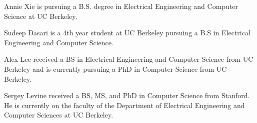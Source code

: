 \documentclass[10pt,journal,compsoc]{IEEEtran}
\begin{document}

\begin{IEEEbiographynophoto}{Annie Xie}
is pursuing a B.S. degree in Electrical Engineering and Computer Science at UC Berkeley. %
\end{IEEEbiographynophoto}
\vskip -13mm

\begin{IEEEbiographynophoto}{Sudeep Dasari} is a 4th year student at UC Berkeley pursuing a B.S in Electrical Engineering and Computer Science. %
\end{IEEEbiographynophoto}
\vskip -13mm

\begin{IEEEbiographynophoto}{Alex Lee} received a BS in Electrical Engineering and Computer Science from UC Berkeley and is currently pursuing a PhD in Computer Science from UC Berkeley. %
\end{IEEEbiographynophoto}
\vskip -13mm

\begin{IEEEbiographynophoto}{Sergey Levine} received a BS, MS, and PhD in Computer Science from Stanford. He is currently on the faculty of the Department of Electrical Engineering and Computer Sciences at UC Berkeley. %
\end{IEEEbiographynophoto}




\appendices





\end{document}
